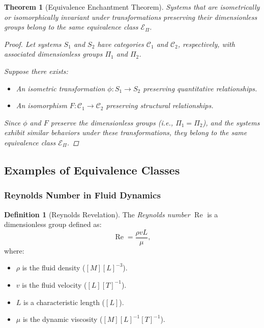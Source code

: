\documentclass{article}
\newtheorem{theorem}{Theorem}[section]
\theoremstyle{definition}
\newtheorem{definition}{Definition}[section]
\theoremstyle{remark}
\begin{document}
	\begin{theorem}[Equivalence Enchantment Theorem]
		Systems that are isometrically or isomorphically invariant under transformations preserving their dimensionless groups belong to the same equivalence class $\mathcal{E}_\Pi$.
		
		\begin{proof}
			Let systems $S_1$ and $S_2$ have categories $\mathcal{C}_1$ and $\mathcal{C}_2$, respectively, with associated dimensionless groups $\Pi_1$ and $\Pi_2$.
			
			Suppose there exists:
			\begin{itemize}
				\item An isometric transformation $\phi: S_1 \rightarrow S_2$ preserving quantitative relationships.
				\item An isomorphism $F: \mathcal{C}_1 \rightarrow \mathcal{C}_2$ preserving structural relationships.
			\end{itemize}
			
			Since $\phi$ and $F$ preserve the dimensionless groups (i.e., $\Pi_1 = \Pi_2$), and the systems exhibit similar behaviors under these transformations, they belong to the same equivalence class $\mathcal{E}_\Pi$.
		\end{proof}
	\end{theorem}
	
	\subsection{Examples of Equivalence Classes}
	
	\subsubsection{Reynolds Number in Fluid Dynamics}
	
	\begin{definition}[Reynolds Revelation]
		The \emph{Reynolds number} $\operatorname{Re}$ is a dimensionless group defined as:
		\[
		\operatorname{Re} = \dfrac{\rho v L}{\mu},
		\]
		where:
		\begin{itemize}
			\item $\rho$ is the fluid density ($[M][L]^{-3}$).
			\item $v$ is the fluid velocity ($[L][T]^{-1}$).
			\item $L$ is a characteristic length ($[L]$).
			\item $\mu$ is the dynamic viscosity ($[M][L]^{-1}[T]^{-1}$).
		\end{itemize}
	\end{definition}
	
\end{document}
